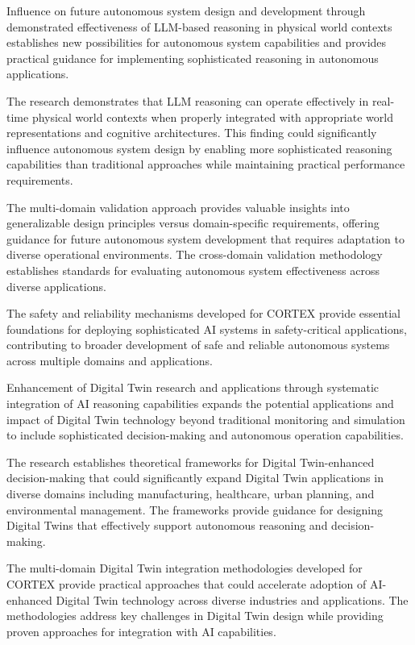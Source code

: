 Influence on future autonomous system design and development through demonstrated effectiveness of LLM-based reasoning in physical world contexts establishes new possibilities for autonomous system capabilities and provides practical guidance for implementing sophisticated reasoning in autonomous applications.

The research demonstrates that LLM reasoning can operate effectively in real-time physical world contexts when properly integrated with appropriate world representations and cognitive architectures. This finding could significantly influence autonomous system design by enabling more sophisticated reasoning capabilities than traditional approaches while maintaining practical performance requirements.

The multi-domain validation approach provides valuable insights into generalizable design principles versus domain-specific requirements, offering guidance for future autonomous system development that requires adaptation to diverse operational environments. The cross-domain validation methodology establishes standards for evaluating autonomous system effectiveness across diverse applications.

The safety and reliability mechanisms developed for CORTEX provide essential foundations for deploying sophisticated AI systems in safety-critical applications, contributing to broader development of safe and reliable autonomous systems across multiple domains and applications.

Enhancement of Digital Twin research and applications through systematic integration of AI reasoning capabilities expands the potential applications and impact of Digital Twin technology beyond traditional monitoring and simulation to include sophisticated decision-making and autonomous operation capabilities.

The research establishes theoretical frameworks for Digital Twin-enhanced decision-making that could significantly expand Digital Twin applications in diverse domains including manufacturing, healthcare, urban planning, and environmental management. The frameworks provide guidance for designing Digital Twins that effectively support autonomous reasoning and decision-making.

The multi-domain Digital Twin integration methodologies developed for CORTEX provide practical approaches that could accelerate adoption of AI-enhanced Digital Twin technology across diverse industries and applications. The methodologies address key challenges in Digital Twin design while providing proven approaches for integration with AI capabilities.

